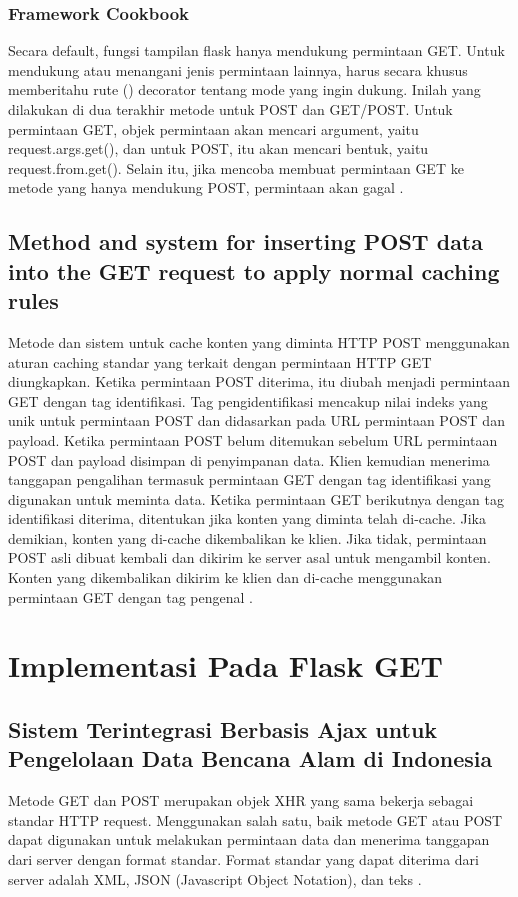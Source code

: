 \subsubsection{Framework Cookbook}
Secara default, fungsi tampilan flask hanya mendukung permintaan GET. Untuk mendukung atau menangani jenis permintaan lainnya, harus secara khusus memberitahu rute () decorator tentang mode yang ingin dukung. Inilah yang dilakukan di dua terakhir metode untuk POST dan GET/POST. Untuk permintaan GET, objek permintaan akan mencari argument, yaitu request.args.get(), dan untuk POST, itu akan mencari bentuk, yaitu request.from.get(). Selain itu, jika mencoba membuat permintaan GET ke metode yang hanya mendukung POST, permintaan akan gagal \cite{aggarwal2014flask}.
\subsection{Method and system for inserting POST data into the GET request to apply normal caching rules}
Metode dan sistem untuk cache konten yang diminta HTTP POST menggunakan aturan caching standar yang terkait dengan permintaan HTTP GET diungkapkan. Ketika permintaan POST diterima, itu diubah menjadi permintaan GET dengan tag identifikasi. Tag pengidentifikasi mencakup nilai indeks yang unik untuk permintaan POST dan didasarkan pada URL permintaan POST dan payload. Ketika permintaan POST belum ditemukan sebelum URL permintaan POST dan payload disimpan di penyimpanan data. Klien kemudian menerima tanggapan pengalihan termasuk permintaan GET dengan tag identifikasi yang digunakan untuk meminta data. Ketika permintaan GET berikutnya dengan tag identifikasi diterima, ditentukan jika konten yang diminta telah di-cache. Jika demikian, konten yang di-cache dikembalikan ke klien. Jika tidak, permintaan POST asli dibuat kembali dan dikirim ke server asal untuk mengambil konten. Konten yang dikembalikan dikirim ke klien dan di-cache menggunakan permintaan GET dengan tag pengenal \cite{sloat2009method}.

\section{Implementasi Pada Flask GET}
\subsection{Sistem Terintegrasi Berbasis Ajax untuk Pengelolaan Data Bencana Alam di Indonesia}
Metode GET dan POST merupakan objek XHR yang sama bekerja sebagai standar HTTP request. Menggunakan salah satu, baik metode GET atau POST dapat digunakan untuk melakukan permintaan data dan menerima tanggapan dari server dengan format standar. Format standar yang dapat diterima dari server adalah XML, JSON (Javascript Object Notation), dan teks \cite{prasetyo2007sistem}.
